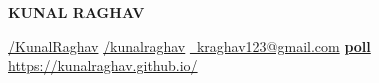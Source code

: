 \documentclass[10pt,a4paper]{extarticle}
\begin{document}
\noindent
	\begin{center}
	\begin{LARGE}
		{
		\color{resumeBlueLight}
			\bfseries{ KUNAL RAGHAV} 
		}\\					
	\end{LARGE}

		\begin{center}
		\href{https://github.com/KunalRaghav}{/KunalRaghav}  \hspace{1mm}
		\href{https://www.linkedin.com/in/kunalraghav/}{/kunalraghav}   \hspace{1mm}
		\href{mailto:kraghav123@gmail.com}{ \ kraghav123@gmail.com} \hspace{1mm}
		\href{https://kunalraghav.github.io/}{{\textbf{\color{resumeBlueLight}\fontAwesome poll}}  https://kunalraghav.github.io/} 
		\end{center}

		
	\end{center}
	\hfill
\end{document}
